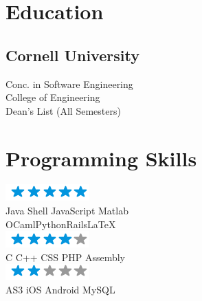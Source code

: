 \documentclass[]{deedy-resume-openfont}
\begin{document}
\begin{minipage}[t]{0.33\textwidth} 


\section{ \textcolor{gray}{} Education} 

\subsection{Cornell University}
\sectionsep


Conc. in Software Engineering \\
College of Engineering \\
Dean's List (All Semesters) \\
\sectionsep


\section{ \textcolor{gray}{} Programming Skills}
\includegraphics[scale=0.80]{img/5stars.png}\\
Java \textbullet{}   Shell \textbullet{} JavaScript \textbullet{} Matlab \\
OCaml\textbullet{}Python\textbullet{}Rails\textbullet{}\LaTeX\ \\
\includegraphics[scale=0.80]{img/4stars.png}\\
C \textbullet{} C++ \textbullet{} CSS \textbullet{} PHP \textbullet{} Assembly \\
\includegraphics[scale=0.80]{img/2stars.png}\\
AS3 \textbullet{} iOS \textbullet{} Android \textbullet{} MySQL
\sectionsep


\end{minipage}
\end{document}
